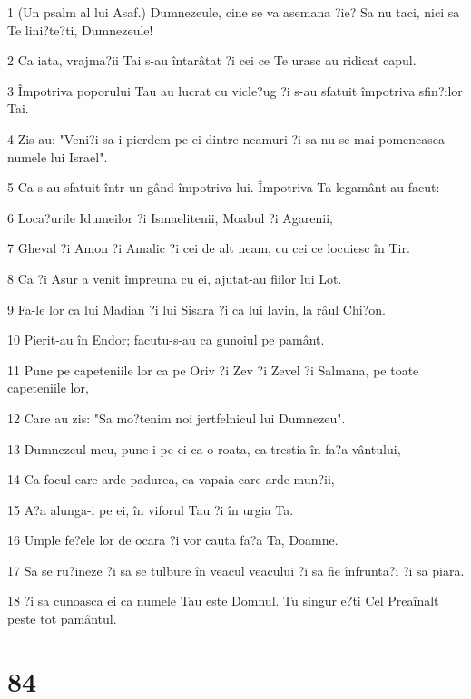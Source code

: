 \par 1 (Un psalm al lui Asaf.) Dumnezeule, cine se va asemana ?ie? Sa nu taci, nici sa Te lini?te?ti, Dumnezeule!
\par 2 Ca iata, vrajma?ii Tai s-au întarâtat ?i cei ce Te urasc au ridicat capul.
\par 3 Împotriva poporului Tau au lucrat cu vicle?ug ?i s-au sfatuit împotriva sfin?ilor Tai.
\par 4 Zis-au: "Veni?i sa-i pierdem pe ei dintre neamuri ?i sa nu se mai pomeneasca numele lui Israel".
\par 5 Ca s-au sfatuit într-un gând împotriva lui. Împotriva Ta legamânt au facut:
\par 6 Loca?urile Idumeilor ?i Ismaelitenii, Moabul ?i Agarenii,
\par 7 Gheval ?i Amon ?i Amalic ?i cei de alt neam, cu cei ce locuiesc în Tir.
\par 8 Ca ?i Asur a venit împreuna cu ei, ajutat-au fiilor lui Lot.
\par 9 Fa-le lor ca lui Madian ?i lui Sisara ?i ca lui Iavin, la râul Chi?on.
\par 10 Pierit-au în Endor; facutu-s-au ca gunoiul pe pamânt.
\par 11 Pune pe capeteniile lor ca pe Oriv ?i Zev ?i Zevel ?i Salmana, pe toate capeteniile lor,
\par 12 Care au zis: "Sa mo?tenim noi jertfelnicul lui Dumnezeu".
\par 13 Dumnezeul meu, pune-i pe ei ca o roata, ca trestia în fa?a vântului,
\par 14 Ca focul care arde padurea, ca vapaia care arde mun?ii,
\par 15 A?a alunga-i pe ei, în viforul Tau ?i în urgia Ta.
\par 16 Umple fe?ele lor de ocara ?i vor cauta fa?a Ta, Doamne.
\par 17 Sa se ru?ineze ?i sa se tulbure în veacul veacului ?i sa fie înfrunta?i ?i sa piara.
\par 18 ?i sa cunoasca ei ca numele Tau este Domnul. Tu singur e?ti Cel Preaînalt peste tot pamântul.

\chapter{84}


